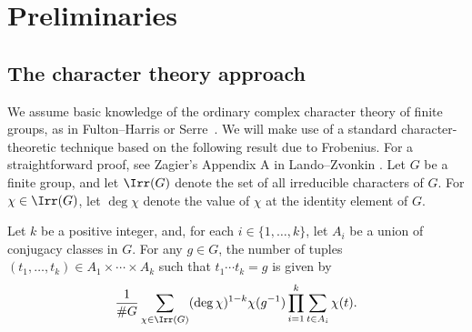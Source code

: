 \section{Preliminaries}
\label{two}






































































\subsection{The character theory approach}
\label{approach}


We assume basic knowledge of the ordinary complex character theory of finite groups,
as in Fulton--Harris \cite{FH} or Serre~\cite{serre}.
We will make use of a standard character-theoretic technique based on the following result due to Frobenius.
For a straightforward proof, see Zagier's Appendix A in Lando--Zvonkin \cite{LZ}.
Let \(G\) be a finite group, and let \(\Irr (G)\) denote the set of all irreducible characters of \(G\).
For \(\chi \in \Irr (G)\), let \(\deg \chi\) denote the value of \(\chi\) at the identity element of \(G\).


\begin{theorem}\label{frob}
Let \(k\) be a positive integer, and, for each \(i \in \{1,\ldots,k\}\), let \(A_i\) be a union of conjugacy classes in \(G\).
For any \(g \in G\), the number of tuples \((t_1,\ldots,t_k) \in A_1 \times \cdots \times A_k\) such that \(t_1 \cdots t_k = g\) is given by
\begin{equation}
\frac{1}{\# G} \sum_{\chi \in \Irr (G)} (\deg \chi)^{1-k} \chi (g^{-1}) \prod_{i = 1}^k \sum_{t \in A_i} \chi(t).
\label{ff}
\end{equation}
\end{theorem}


